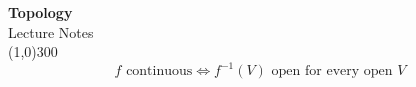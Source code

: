 \documentclass[11pt,a4paper]{article}
\theoremstyle{definition}
\begin{document}
\begin{titlepage}
\thispagestyle{empty}
\begin{center}
\vspace*{3cm}
{\Huge\bfseries Topology}\\[1.2cm]
{\large Lecture Notes}\\[2.5cm]
\line(1,0){300}\\[1.5cm]
$$f \text{ continuous} \iff f^{-1}(V) \text{ open for every open } V$$
\end{center}
\end{titlepage}

\tableofcontents
\thispagestyle{empty}
\clearpage
\setcounter{page}{1}
















\pagebreak
\end{document}
